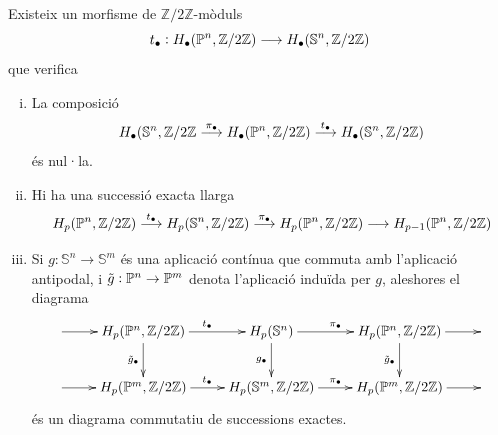 \documentclass[../main.tex]{subfiles}
\begin{document}
\begin{prop}
\label{prop:borsuk-ulam} Existeix un morfisme de $\mathbb{Z}/2\mathbb{Z}$-mòduls
\begin{equation}
    \notag
    t_\bullet:H_\bullet(\mathbb{P}^n,\mathbb{Z}/2\mathbb{Z})\longrightarrow H_\bullet(\mathbb{S}^n,\mathbb{Z}/2\mathbb{Z})
\end{equation}
que verifica
\begin{enumerate}[(i)]
    \item La composició
    \begin{equation}
        \notag
        H_\bullet(\mathbb{S}^n,\mathbb{Z}/2\mathbb{Z}\overset{\pi_\bullet}{\longrightarrow} H_\bullet(\mathbb{P}^n,\mathbb{Z}/2\mathbb{Z})\overset{t_\bullet}{\longrightarrow}H_\bullet(\mathbb{S}^n,\mathbb{Z}/2\mathbb{Z})
    \end{equation}
    és nul·la.
    \item Hi ha una successió exacta llarga
    \begin{equation}
        \notag
        H_p(\mathbb{P}^n,\mathbb{Z}/2\mathbb{Z})\overset{t_\bullet}{\longrightarrow} H_p(\mathbb{S}^n,\mathbb{Z}/2\mathbb{Z})\overset{\pi_\bullet}{\longrightarrow} H_p(\mathbb{P}^n,\mathbb{Z}/2\mathbb{Z})\longrightarrow H_{p-1}(\mathbb{P}^n,\mathbb{Z}/2\mathbb{Z})
    \end{equation}
    \item Si $g:\mathbb{S}^n\rightarrow\mathbb{S}^m$ és una aplicació contínua que commuta amb l'aplicació antipodal, i $\Tilde{g}:\mathbb{P}^n\rightarrow\mathbb{P}^m$ denota l'aplicació induïda per $g$, aleshores el diagrama
    \begin{equation}
        \notag
        \xymatrix{
        \ar[r]&H_p(\mathbb{P}^n,\mathbb{Z}/2\mathbb{Z})\ar[r]^{t_\bullet}\ar[d]_{\Tilde{g}_\bullet} & H_p(\mathbb{S}^n)\ar[r]^{\pi_\bullet}\ar[d]_{g_\bullet} & H_p(\mathbb{P}^n,\mathbb{Z}/2\mathbb{Z})\ar[r]\ar[d]_{\Tilde{g}_\bullet} & \\
        \ar[r] & H_p(\mathbb{P}^m,\mathbb{Z}/2\mathbb{Z})\ar[r]^{t_\bullet}& H_p(\mathbb{S}^m,\mathbb{Z}/2\mathbb{Z})\ar[r]^{\pi_\bullet} & H_p(\mathbb{P}^m,\mathbb{Z}/2\mathbb{Z})\ar[r] & 
        }
    \end{equation}
    és un diagrama commutatiu de successions exactes.
\end{enumerate}
\end{prop}
\end{document}
